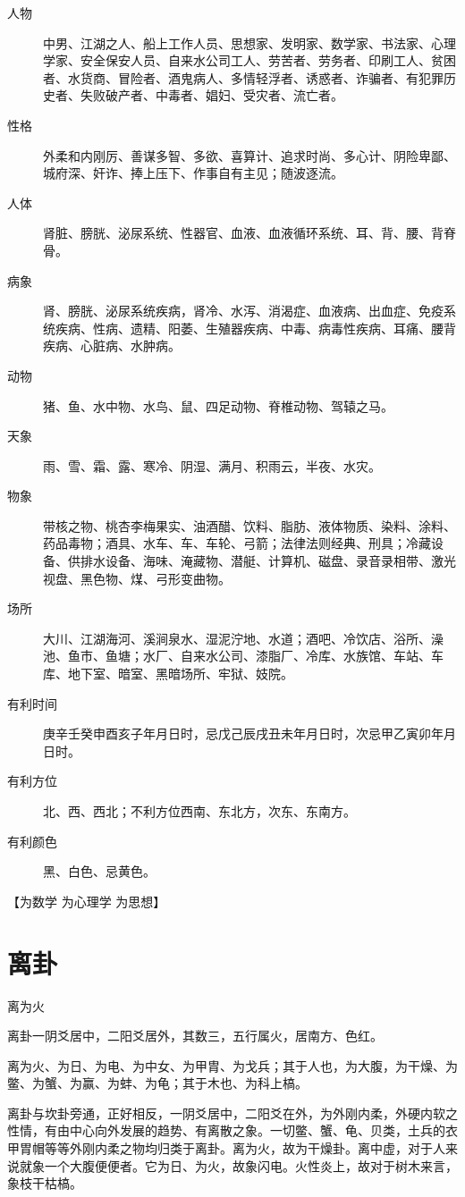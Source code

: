 \documentclass[12pt,oneside]{book}
\begin{document}
\begin{description}
\item[人物] 中男、江湖之人、船上工作人员、思想家、发明家、数学家、书法家、心理学家、安全保安人员、自来水公司工人、劳苦者、劳务者、印刷工人、贫困者、水货商、冒险者、酒鬼病人、多情轻浮者、诱惑者、诈骗者、有犯罪历史者、失败破产者、中毒者、娼妇、受灾者、流亡者。
\item[性格] 外柔和内刚厉、善谋多智、多欲、喜算计、追求时尚、多心计、阴险卑鄙、城府深、奸诈、捧上压下、作事自有主见；随波逐流。
\item[人体] 肾脏、膀胱、泌尿系统、性器官、血液、血液循环系统、耳、背、腰、背脊骨。
\item[病象] 肾、膀胱、泌尿系统疾病，肾冷、水泻、消渴症、血液病、出血症、免疫系统疾病、性病、遗精、阳萎、生殖器疾病、中毒、病毒性疾病、耳痛、腰背疾病、心脏病、水肿病。
\item[动物] 猪、鱼、水中物、水鸟、鼠、四足动物、脊椎动物、驾辕之马。
\item[天象] 雨、雪、霜、露、寒冷、阴湿、满月、积雨云，半夜、水灾。
\item[物象] 带核之物、桃杏李梅果实、油酒醋、饮料、脂肪、液体物质、染料、涂料、药品毒物；酒具、水车、车、车轮、弓箭；法律法则经典、刑具；冷藏设备、供排水设备、海味、淹藏物、潜艇、计算机、磁盘、录音录相带、激光视盘、黑色物、煤、弓形变曲物。
\item[场所] 大川、江湖海河、溪涧泉水、湿泥泞地、水道；酒吧、冷饮店、浴所、澡池、鱼市、鱼塘；水厂、自来水公司、漆脂厂、冷库、水族馆、车站、车库、地下室、暗室、黑暗场所、牢狱、妓院。
\item[有利时间] 庚辛壬癸申酉亥子年月日时，忌戊己辰戌丑未年月日时，次忌甲乙寅卯年月日时。
\item[有利方位] 北、西、西北；不利方位西南、东北方，次东、东南方。
\item[有利颜色] 黑、白色、忌黄色。
\end{description}


【为数学 为心理学 为思想】


\section{离卦}
离为火

离卦一阴爻居中，二阳爻居外，其数三，五行属火，居南方、色红。

离为火、为日、为电、为中女、为甲胄、为戈兵；其于人也，为大腹，为干燥、为鳖、为蟹、为赢、为蚌、为龟；其于木也、为科上槁。

离卦与坎卦旁通，正好相反，一阴爻居中，二阳爻在外，为外刚内柔，外硬内软之性情，有由中心向外发展的趋势、有离散之象。一切鳖、蟹、龟、贝类，土兵的衣甲胃帽等等外刚内柔之物均归类于离卦。离为火，故为干燥卦。离中虚，对于人来说就象一个大腹便便者。它为日、为火，故象闪电。火性炎上，故对于树木来言，象枝干枯槁。
\end{document}
